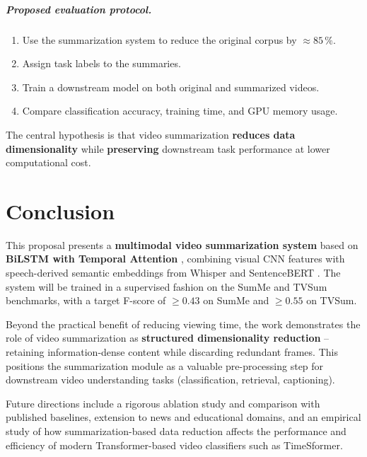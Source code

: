 \documentclass[12pt, a4paper]{report}
\begin{document}
\paragraph{Proposed evaluation protocol.}
\begin{enumerate}[leftmargin=1.5cm]
  \item Use the summarization system to reduce the original corpus by $\approx 85\,\%$.
  \item Assign task labels to the summaries.
  \item Train a downstream model on both original and summarized videos.
  \item Compare classification accuracy, training time, and GPU memory usage.
\end{enumerate}

The central hypothesis is that video summarization \textbf{reduces data dimensionality}
while \textbf{preserving} downstream task performance at lower computational cost.

\chapter{Conclusion}

This proposal presents a \textbf{multimodal video summarization system} based on
\textbf{BiLSTM with Temporal Attention} \cite{zhang2016}, combining visual CNN features
with speech-derived semantic embeddings from Whisper \cite{radford2023} and SentenceBERT
\cite{reimers2019}. The system will be trained in a supervised fashion on the SumMe
\cite{gygli2014} and TVSum \cite{song2015} benchmarks, with a target F-score of
$\geq 0.43$ on SumMe and $\geq 0.55$ on TVSum.

Beyond the practical benefit of reducing viewing time, the work demonstrates the role
of video summarization as \textbf{structured dimensionality reduction} -- retaining
information-dense content while discarding redundant frames. This positions the
summarization module as a valuable pre-processing step for downstream video
understanding tasks (classification, retrieval, captioning).

Future directions include a rigorous ablation study and comparison with published
baselines, extension to news and educational domains, and an empirical study of how
summarization-based data reduction affects the performance and efficiency of modern
Transformer-based video classifiers such as TimeSformer.
\end{document}
